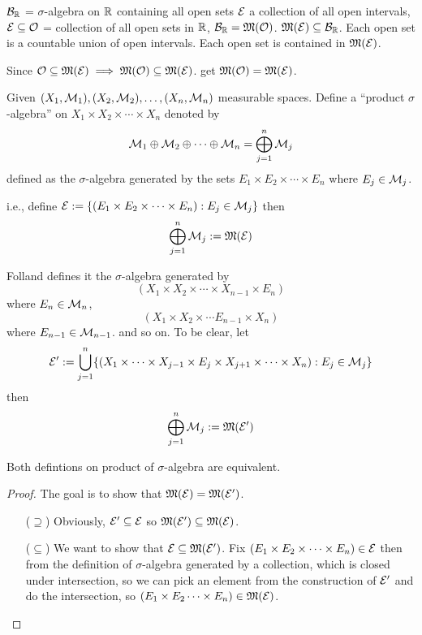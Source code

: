 \begin{example}
  $\mathcal B_\mathbb R$ = $\sigma$-algebra on $\mathbb R$ containing all open sets 
  $\mathcal E$ a collection of all open intervals, 
  $\mathcal E\subseteq\mathcal O$ = collection of all open sets in $\mathbb R$,
  $\mathcal B_\mathbb R = \mathfrak M(\mathcal O)$. $\mathfrak M(\mathcal E) \subseteq \mathcal B_\mathbb R$.
  Each open set is a countable union of open intervals. Each open set is contained in $\mathfrak M(\mathcal E)$.
  
  Since $\mathcal O \subseteq \mathfrak M(\mathcal E) \implies \mathfrak M(\mathcal O) \subseteq \mathfrak M(\mathcal E)$.
  get $\mathfrak M(\mathcal O) = \mathfrak M(\mathcal E)$.
\end{example}


\begin{definition}
  Given $(X_1, \mathcal M_1), (X_2, \mathcal M_2), \dotsc, (X_n, \mathcal M_n)$ measurable spaces.
  Define a ``product $\sigma$-algebra'' on $X_1 \times X_2 \times \dotsm \times X_n$ denoted by
  \[\mathcal M_1 \oplus \mathcal M_2\oplus \dotsm \oplus \mathcal M_n = \bigoplus_{j=1}^n \mathcal M_j\]
  defined as the $\sigma$-algebra generated by the sets $E_1 \times E_2 \times \dotsm \times E_n$ where $E_j \in \mathcal M_j$.
  
  i.e., define $\mathcal E := \{(E_1 \times E_2 \times \dotsm \times E_n) : E_j \in \mathcal M_j\}$ then 
  \[ \bigoplus_{j=1}^n \mathcal M_j := \mathfrak M(\mathcal E)\]
\end{definition}

\begin{remark}
  Folland defines it the $\sigma$-algebra generated by 
  \[(X_1 \times X_2 \times \dotsm \times X_{n-1} \times E_n)\]
  where $E_n \in \mathcal M_n$, 
  \[(X_1 \times X_2 \times \dotsm E_{n-1} \times X_n)\]
  where $E_{n-1} \in \mathcal M_{n-1}$.
  and so on. To be clear, let 
  \[\mathcal E' := \bigcup_{j=1}^n \{ (X_1 \times \dotsm\times  X_{j-1} \times E_j \times X_{j+1} \times \dotsm \times X_n) : E_j \in \mathcal M_j\}\]
  then 
  \[\bigoplus_{j=1}^n \mathcal M_j := \mathfrak M(\mathcal E') \]
\end{remark}

\begin{claim}
  Both defintions on product of $\sigma$-algebra are equivalent. 
\end{claim}

\begin{proof}
  The goal is to show that $\mathfrak M(\mathcal E) = \mathfrak M(\mathcal E')$.
  \begin{itemize}
    \item[($\supseteq$)] Obviously, $\mathcal E' \subseteq \mathcal E$ so $\mathfrak M(\mathcal E') \subseteq \mathfrak M(\mathcal E)$.
    \item[($\subseteq$)] We want to show that $\mathcal E \subseteq \mathfrak M(\mathcal E')$. Fix $(E_1 \times E_2 \times \dotsm \times E_n) \in \mathcal E$ then 
    from the definition of $\sigma$-algebra generated by a collection, which is closed under intersection, so we can pick an element from the 
    construction of $\mathcal E'$ and do the intersection, so $(E_1 \times E_2 \dotsm \times E_n) \in \mathfrak M(\mathcal E)$.

  \end{itemize}
\end{proof}

